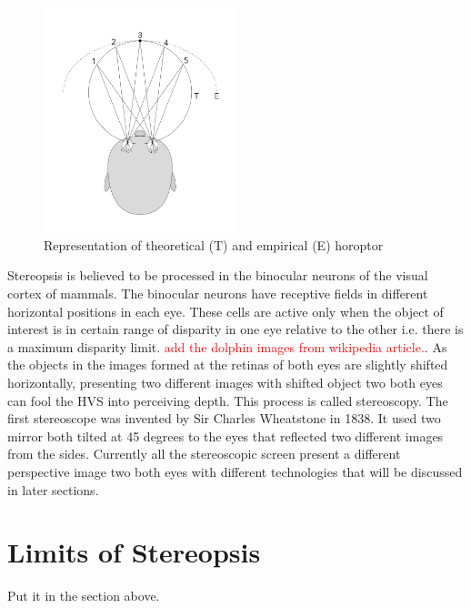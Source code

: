 \begin{figure}
\centering
    \includegraphics[width=0.5\textwidth]{./Template_Figures/horopter}
    \caption{Representation of theoretical (T) and empirical (E) horoptor\label{fig:horoptor}}
\end{figure}

Stereopsis is believed to be processed in the binocular neurons of the visual cortex of mammals. The binocular neurons have receptive fields in different horizontal positions in each eye. These cells are active only when the object of interest is in certain range of disparity in one eye relative to the other i.e. there is a maximum disparity limit. \textcolor{red}{add the dolphin images from wikipedia article.}. As the objects in the images formed at the retinas of both eyes are slightly shifted horizontally, presenting two different images with shifted object two both eyes can fool the HVS into perceiving depth. This process is called stereoscopy. The first stereoscope was invented by Sir Charles Wheatstone in 1838\cite{ wiki:wheatstone}. It used two mirror both tilted at 45 degrees to the eyes that reflected two different images from the sides. Currently all the stereoscopic screen present a different perspective image two both eyes with different technologies that will be discussed in later sections.

\section{Limits of Stereopsis}
Put it in the section above.








